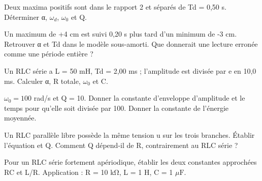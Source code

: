 \begin{questions}
\item Deux maxima positifs sont dans le rapport 2 et séparés de Td = 0,50 s. Déterminer α, $\omega_d$, $\omega_0$ et Q.
\end{questions}

\begin{questions}
\item Un maximum de +4 cm est suivi 0,20 s plus tard d’un minimum de -3 cm. Retrouver α et Td dans le modèle sous-amorti. Que donnerait une lecture erronée comme une période entière ?
\end{questions}



\begin{questions}
\item Un RLC série a L = 50 mH, Td = 2,00 ms ; l’amplitude est divisée par e en 10,0 ms. Calculer α, R totale, $\omega_0$ et C.
\end{questions}

\begin{questions}
\item $\omega_0=100$ rad/s et Q = 10. Donner la constante d’enveloppe d’amplitude et le temps pour qu’elle soit divisée par 100. Donner la constante de l’énergie moyennée.
\end{questions}

\begin{questions}
\item Un RLC parallèle libre possède la même tension u sur les trois branches. Établir l’équation et Q. Comment Q dépend-il de R, contrairement au RLC série ?
\end{questions}



\begin{questions}
\item Pour un RLC série fortement apériodique, établir les deux constantes approchées RC et L/R. Application : R = 10 kΩ, L = 1 H, C = 1 $\mu\mathrm{ F}$.
\end{questions}

